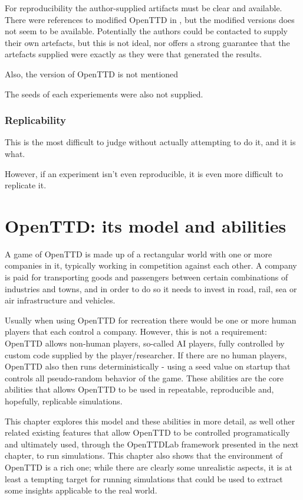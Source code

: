 \documentclass[logo,msc,dsti]{infthesis}    %
\begin{document}
For reproducibility the author-supplied artifacts must be clear and available. There were references to modified OpenTTD in \cite{wisniewski2011artificial}, but the modified versions does not seem to be available. Potentially the authors could be contacted to supply their own artefacts, but this is not ideal, nor offers a strong guarantee that the artefacts supplied were exactly as they were that generated the results.

Also, the version of OpenTTD is not mentioned

The seeds of each experiements were also not supplied.

\subsection{Replicability}

This is the most difficult to judge without actually attempting to do it, and it is what.

However, if an experiment isn't even reproducible, it is even more difficult to replicate it.

\chapter{OpenTTD: its model and abilities}

A game of OpenTTD is made up of a rectangular world with one or more companies in it, typically working in competition against each other. A company is paid for transporting goods and passengers between certain combinations of industries and towns, and in order to do so it needs to invest in road, rail, sea or air infrastructure and vehicles.

Usually when using OpenTTD for recreation there would be one or more human players that each control a company. However, this is not a requirement: OpenTTD allows non-human players, so-called AI players, fully controlled by custom code supplied by the player/researcher. If there are no human players, OpenTTD also then runs deterministically - using a seed value on startup that controls all pseudo-random behavior of the game. These abilities are the core abilities that allows OpenTTD to be used in repeatable, reproducible and, hopefully, replicable simulations.

This chapter explores this model and these abilities in more detail, as well other related existing features that allow OpenTTD to be controlled programatically and ultimately used, through the OpenTTDLab framework presented in the next chapter, to run simulations. This chapter also shows that the environment of OpenTTD is a rich one; while there are clearly some unrealistic aspects, it is at least a tempting target for running simulations that could be used to extract some insights applicable to the real world.
\end{document}
